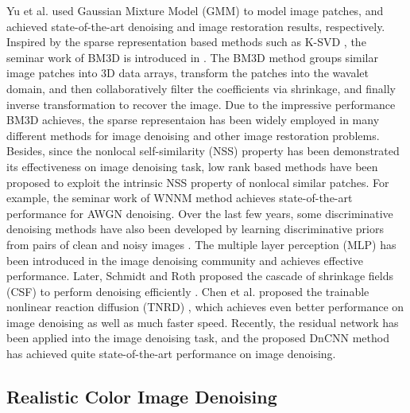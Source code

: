 Yu et al.  \cite{ple} used Gaussian Mixture Model (GMM) to model image patches, and achieved state-of-the-art denoising and image restoration results, respectively. Inspired by the sparse representation based methods such as K-SVD \cite{ksvd}, the seminar work of BM3D is introduced in \cite{bm3d}. The BM3D method groups similar image patches into 3D data arrays, transform the  patches into the wavalet domain, and then collaboratively filter the coefficients via shrinkage, and finally inverse transformation to recover the image. Due to the impressive performance BM3D achieves, the sparse representaion has been widely employed in many different methods \cite{lssc,ncsr} for image denoising and other image restoration problems. Besides, since the nonlocal self-similarity (NSS) property has been demonstrated its effectiveness on image denoising task, low rank based methods \cite{nnm,wnnm} have been proposed to exploit the intrinsic NSS property of nonlocal similar patches. For example, the seminar work of WNNM \cite{wnnm} method achieves state-of-the-art performance for AWGN denoising. Over the last few years, some discriminative denoising methods have also been developed by learning discriminative priors from pairs of clean and noisy images \cite{mlp,csf,tnrd, dncnn}. The multiple layer perception (MLP) \cite{mlp} has been introduced in the image denoising community and achieves effective performance. Later, Schmidt and Roth proposed the cascade of shrinkage fields (CSF) to perform denoising efficiently \cite{csf}. Chen et al. proposed the trainable nonlinear reaction diffusion (TNRD) \cite{tnrd}, which achieves even better performance on image denoising as well as much faster speed. Recently, the residual network \cite{residualnetwork} has been applied into the image denoising task, and the proposed DnCNN method \cite{dncnn} has achieved quite state-of-the-art performance on image denoising.


\subsection{Realistic Color Image Denoising}
\label{sec:review:feature}

